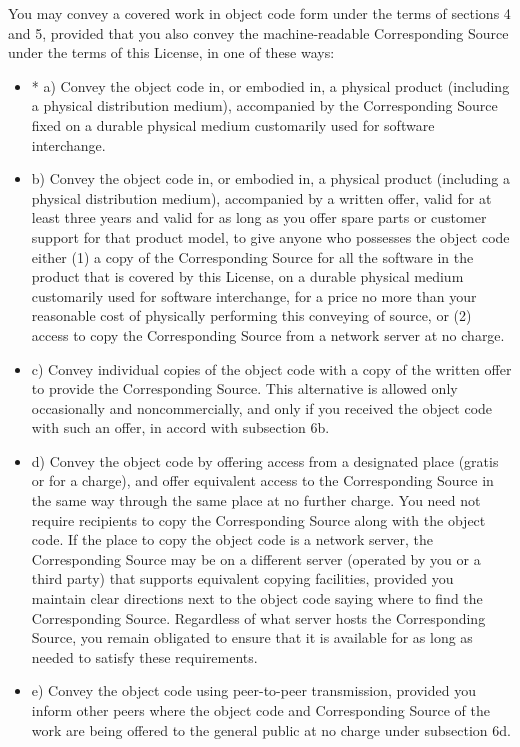 \documentclass[11pt,a4paper]{article}
\begin{document}
You may convey a covered work in object code form under the terms of
sections 4 and 5, provided that you also convey the machine-readable
Corresponding Source under the terms of this License, in one of these
ways:
\begin{itemize}
\item * a) Convey the object code in, or embodied in, a physical product
(including a physical distribution medium), accompanied by the
Corresponding Source fixed on a durable physical medium customarily used
for software interchange.
\item b) Convey the object code in, or embodied in, a physical product
(including a physical distribution medium), accompanied by a written
offer, valid for at least three years and valid for as long as you offer
spare parts or customer support for that product model, to give anyone
who possesses the object code either (1) a copy of the Corresponding
Source for all the software in the product that is covered by this
License, on a durable physical medium customarily used for software
interchange, for a price no more than your reasonable cost of physically
performing this conveying of source, or (2) access to copy the
Corresponding Source from a network server at no charge.
\item c) Convey individual copies of the object code with a copy of the
written offer to provide the Corresponding Source. This alternative is
allowed only occasionally and noncommercially, and only if you received
the object code with such an offer, in accord with subsection 6b.
\item d) Convey the object code by offering access from a designated
place (gratis or for a charge), and offer equivalent access to the
Corresponding Source in the same way through the same place at no
further charge. You need not require recipients to copy the
Corresponding Source along with the object code. If the place to copy
the object code is a network server, the Corresponding Source may be on
a different server (operated by you or a third party) that supports
equivalent copying facilities, provided you maintain clear directions
next to the object code saying where to find the Corresponding Source.
Regardless of what server hosts the Corresponding Source, you remain
obligated to ensure that it is available for as long as needed to
satisfy these requirements.
\item e) Convey the object code using peer-to-peer transmission,
provided you inform other peers where the object code and Corresponding
Source of the work are being offered to the general public at no charge
under subsection 6d.
\end{itemize}
    
\end{document}
